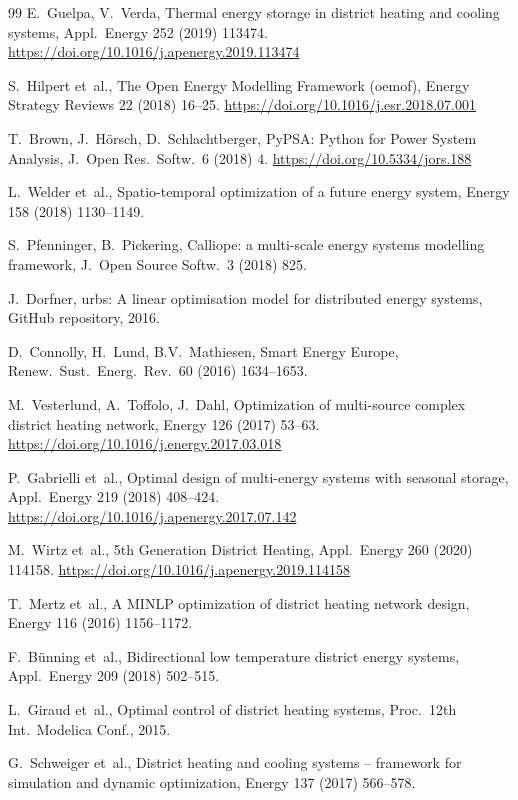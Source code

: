 \documentclass[review,3p]{elsarticle}
\begin{document}
\begin{thebibliography}{99}
E.~Guelpa, V.~Verda,
Thermal energy storage in district heating and cooling systems,
Appl.\ Energy 252 (2019) 113474.
\url{https://doi.org/10.1016/j.apenergy.2019.113474}

S.~Hilpert et~al.,
The Open Energy Modelling Framework (oemof),
Energy Strategy Reviews 22 (2018) 16--25.
\url{https://doi.org/10.1016/j.esr.2018.07.001}

T.~Brown, J.~H\"{o}rsch, D.~Schlachtberger,
PyPSA: Python for Power System Analysis,
J.\ Open Res.\ Softw.\ 6 (2018) 4.
\url{https://doi.org/10.5334/jors.188}

L.~Welder et~al.,
Spatio-temporal optimization of a future energy system,
Energy 158 (2018) 1130--1149.

S.~Pfenninger, B.~Pickering,
Calliope: a multi-scale energy systems modelling framework,
J.\ Open Source Softw.\ 3 (2018) 825.

J.~Dorfner,
urbs: A linear optimisation model for distributed energy systems,
GitHub repository, 2016.

D.~Connolly, H.~Lund, B.V.~Mathiesen,
Smart Energy Europe,
Renew.\ Sust.\ Energ.\ Rev.\ 60 (2016) 1634--1653.

M.~Vesterlund, A.~Toffolo, J.~Dahl,
Optimization of multi-source complex district heating network,
Energy 126 (2017) 53--63.
\url{https://doi.org/10.1016/j.energy.2017.03.018}

P.~Gabrielli et~al.,
Optimal design of multi-energy systems with seasonal storage,
Appl.\ Energy 219 (2018) 408--424.
\url{https://doi.org/10.1016/j.apenergy.2017.07.142}

M.~Wirtz et~al.,
5th Generation District Heating,
Appl.\ Energy 260 (2020) 114158.
\url{https://doi.org/10.1016/j.apenergy.2019.114158}

T.~Mertz et~al.,
A MINLP optimization of district heating network design,
Energy 116 (2016) 1156--1172.

F.~B\"{u}nning et~al.,
Bidirectional low temperature district energy systems,
Appl.\ Energy 209 (2018) 502--515.

L.~Giraud et~al.,
Optimal control of district heating systems,
Proc.\ 12th Int.\ Modelica Conf., 2015.

G.~Schweiger et~al.,
District heating and cooling systems -- framework for simulation and
dynamic optimization,
Energy 137 (2017) 566--578.


\end{thebibliography}
\end{document}
